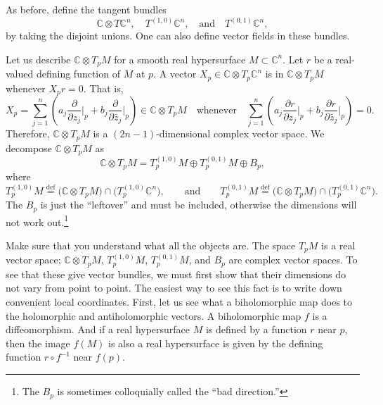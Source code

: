 \documentclass[12pt,openany]{book}
\newcommand{\C}{{\mathbb{C}}}
\theoremstyle{plain}
\theoremstyle{remark}
\theoremstyle{definition}
\theoremstyle{exercise}
\theoremstyle{example}
\begin{document}
As before, define the tangent bundles
\begin{equation*}
\C \otimes T\C^n,
\quad
T^{(1,0)} \C^n,
\quad \text{and} \quad
T^{(0,1)} \C^n ,
\end{equation*}
by taking the disjoint unions.
One can also define vector fields in these bundles.

Let us describe $\C \otimes T_pM$
for a smooth real hypersurface $M \subset \C^n$.
Let $r$ be a real-valued defining function of
$M$ at $p$.  A vector
$X_p \in \C \otimes T_p\C^n$ is in
$\C \otimes T_pM$ whenever $X_p r = 0$.  That is,
\begin{equation*}
X_p = \sum_{j=1}^n
\left(
a_j 
\frac{\partial}{\partial z_j} \Big|_p
+
b_j
\frac{\partial}{\partial \bar{z}_j} \Big|_p
\right) \in \C \otimes T_p M
\quad
\text{whenever}
\quad
 \sum_{j=1}^n
\left(
a_j 
\frac{\partial r}{\partial z_j} \Big|_p
+
b_j
\frac{\partial r}{\partial \bar{z}_j} \Big|_p
\right)
= 0 .
\end{equation*}
Therefore, $\C \otimes T_p M$ is a $(2n-1)$-dimensional complex vector space.
We decompose 
$\C \otimes T_p M$ as
\begin{equation*}
\C \otimes T_pM = 
T_p^{(1,0)} M \oplus T_p^{(0,1)} M \oplus B_p ,
\end{equation*}
where
\begin{equation*}
T_p^{(1,0)} M \overset{\text{def}}{=} \bigl( \C \otimes T_pM \bigr) \cap
\bigl( T_p^{(1,0)} \C^n \bigr),  \qquad \text{and}
\qquad
T_p^{(0,1)} M \overset{\text{def}}{=} \bigl( \C \otimes T_pM \bigr) \cap
\bigl( T_p^{(0,1)} \C^n \bigr) .
\end{equation*}
The $B_p$ is just the ``leftover'' and must
be included, otherwise the dimensions will not work out.\footnote{%
The $B_p$ is sometimes colloquially called the ``bad direction.''}

Make sure that you understand what all the objects are.  The space
$T_pM$ is a real vector space; $\C \otimes T_pM$, $T_p^{(1,0)}M$,
$T_p^{(0,1)} M$, and $B_p$ are complex vector spaces.  To see that
these give vector bundles,
we must first show that their dimensions do not vary
from point to point.  The easiest way to see this fact is to write down
convenient local coordinates.  First, let us see what a biholomorphic map
does to the holomorphic and antiholomorphic vectors.  A biholomorphic map
$f$ is a diffeomorphism.  And if a real hypersurface $M$ is defined
by a function $r$ near $p$, then the image $f(M)$ is also
a real hypersurface is given by the defining function
$r \circ f^{-1}$ near $f(p)$.
\end{document}
